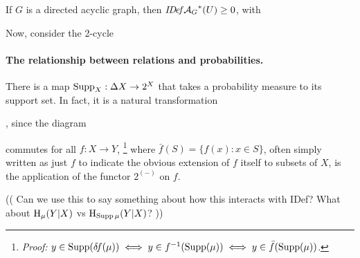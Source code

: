 \begin{prop}
    If $G$ is a directed acyclic graph, then 
    $\mathit{I\mskip-3.0muD\mskip-2.5mue\mskip-1.5muf}{\mathcal A_G}^*(U) \ge 0$, with 
\end{prop}

\begin{example}
    Now, consider the 2-cycle
\end{example}


\bigskip

\paragraph{The relationship between relations and probabilities.}
There is a map $\operatorname{\mathrm{Supp}}_X : \Delta X \to 2^X$ that takes a probability measure to its support set.  In fact, it is a natural transformation
\begin{center}
,
    \qquad
    since the diagram
    \qquad
{}
\end{center}
commutes for all $f : X \to Y$,%
\unskip\footnote{\textit{Proof:} 
$
    y \in \operatorname{\mathrm{Supp}}(\delta\!f(\mu)) 
    \iff y \in f^{-1}( \operatorname{\mathrm{Supp}}(\mu))
    \iff y \in \bar f(\operatorname{\mathrm{Supp}}(\mu))
$.
}
where
$\bar f(S) = \{ f(x) : x \in S\}$, often simply written as just $f$ to indicate the obvious extension of $f$ itself to subsets of $X$, is the application of the functor $2^{(-)}$ on $f$.


(( Can we use this to say something about how this interacts with IDef? What about $\operatorname{\mathrm{H}}_\mu(Y|X)$ vs $\operatorname{\mathrm{H}}_{\operatorname{\mathrm{Supp}} \mu}(Y|X)$? ))
